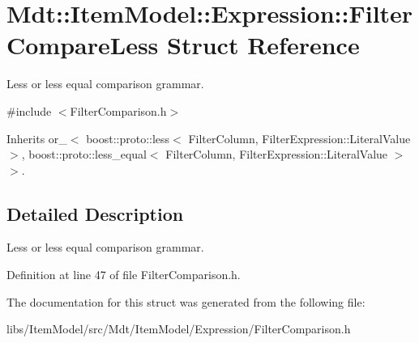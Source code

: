 \hypertarget{struct_mdt_1_1_item_model_1_1_expression_1_1_filter_compare_less}{}\section{Mdt\+:\+:Item\+Model\+:\+:Expression\+:\+:Filter\+Compare\+Less Struct Reference}
\label{struct_mdt_1_1_item_model_1_1_expression_1_1_filter_compare_less}


Less or less equal comparison grammar.  




{\ttfamily \#include $<$Filter\+Comparison.\+h$>$}



Inherits or\+\_\+$<$ boost\+::proto\+::less$<$ Filter\+Column, Filter\+Expression\+::\+Literal\+Value $>$, boost\+::proto\+::less\+\_\+equal$<$ Filter\+Column, Filter\+Expression\+::\+Literal\+Value $>$ $>$.



\subsection{Detailed Description}
Less or less equal comparison grammar. 

Definition at line 47 of file Filter\+Comparison.\+h.



The documentation for this struct was generated from the following file\+:\begin{DoxyCompactItemize}
\item 
libs/\+Item\+Model/src/\+Mdt/\+Item\+Model/\+Expression/Filter\+Comparison.\+h\end{DoxyCompactItemize}
